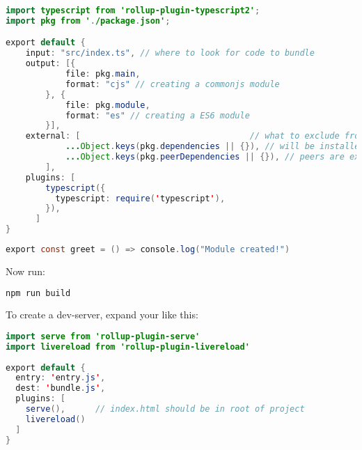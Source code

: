 \begin{lstlisting}[language=java, caption=rollup.config.js]
import typescript from 'rollup-plugin-typescript2';
import pkg from './package.json';

export default {
    input: "src/index.ts", // where to look for code to bundle
    output: [{
            file: pkg.main,
            format: "cjs" // creating a commonjs module
        }, {
            file: pkg.module,
            format: "es" // creating a ES6 module
        }],
    external: [                                  // what to exclude from packaging
            ...Object.keys(pkg.dependencies || {}), // will be installed by npm
            ...Object.keys(pkg.peerDependencies || {}), // peers are expected to be installed by user
        ],
    plugins: [
        typescript({
          typescript: require('typescript'),
        }),
      ]
}
\end{lstlisting}

\begin{lstlisting}[language=java, caption=src/index.ts]
  export const greet = () => console.log("Module created!")
\end{lstlisting}

Now run: 
\begin{lstlisting}[language=bash]
  npm run build
\end{lstlisting}

To create a dev-server, expand your  like this: 
\begin{lstlisting}[language=java]
import serve from 'rollup-plugin-serve'
import livereload from 'rollup-plugin-livereload'
 
export default {
  entry: 'entry.js',
  dest: 'bundle.js',
  plugins: [
    serve(),      // index.html should be in root of project
    livereload()
  ]
}
\end{lstlisting}